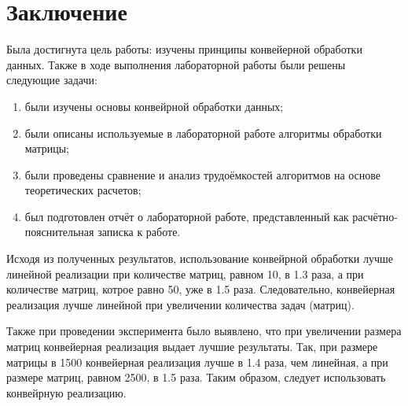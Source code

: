 \chapter*{Заключение}

Была достигнута цель работы: изучены принципы конвейерной обработки данных.
Также в ходе выполнения лабораторной работы были решены следующие задачи:

\begin{enumerate}[label=\arabic*)]
	\item были изучены основы конвейрной обработки данных;
	\item были описаны используемые в лабораторной работе алгоритмы обработки матрицы;
    \item были проведены сравнение и анализ трудоёмкостей алгоритмов на основе теоретических расчетов;
	\item был подготовлен отчёт о лабораторной работе, представленный как расчётно-пояснительная записка к работе.
\end{enumerate}


Исходя из полученных результатов, использование конвейрной обработки лучше линейной реализации при количестве матриц, равном 10, в 1.3 раза, а при количестве матриц, котрое равно 50, уже в 1.5 раза. Следовательно, конвейерная реализация лучше линейной при увеличении количества задач (матриц).

Также при проведении эксперимента было выявлено, что при увеличении размера матриц конвейерная реализация выдает лучшие результаты. Так, при размере матрицы в 1500 конвейерная реализация лучше в 1.4 раза, чем линейная, а при размере матриц, равном 2500, в 1.5 раза. Таким образом, следует использовать конвейрную реализацию.